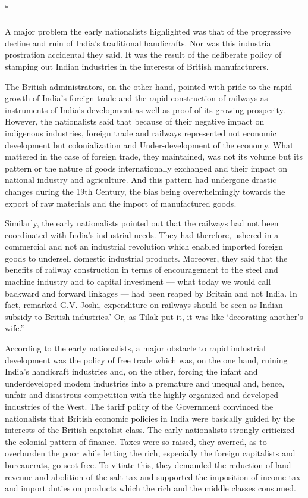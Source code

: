 \begin{center}*\end{center}

\paragraph*{}

A major problem the early nationalists highlighted was that of the progressive decline and ruin of India's traditional handicrafts. Nor was this industrial prostration accidental they said. It was the result of the deliberate policy of stamping out Indian industries in the interests of British manufacturers.

The British administrators, on the other hand, pointed with pride to the rapid growth of India's foreign trade and the rapid construction of railways as instruments of India's development as well as proof of its growing prosperity. However, the nationalists said that because of their negative impact on indigenous industries, foreign trade and railways represented not economic development but colonialization and Under-development of the economy. What mattered in the case of foreign trade, they maintained, was not its volume but its pattern or the nature of goods internationally exchanged and their impact on national industry and agriculture. And this pattern had undergone drastic changes during the 19th Century, the bias being overwhelmingly towards the export of raw materials and the import of manufactured goods.

Similarly, the early nationalists pointed out that the railways had not been coordinated with India's industrial needs. They had therefore, ushered in a commercial and not an industrial revolution which enabled imported foreign goods to undersell domestic industrial products. Moreover, they said that the benefits of railway construction in terms of encouragement to the steel and machine industry and to capital investment --- what today we would call backward and forward linkages --- had been reaped by Britain and not India. In fact, remarked G.V. Joshi, expenditure on railways should be seen as Indian subsidy to British industries.' Or, as Tilak put it, it was like `decorating another's wife.''

According to the early nationalists, a major obstacle to rapid industrial development was the policy of free trade which was, on the one hand, ruining India's handicraft industries and, on the other, forcing the infant and underdeveloped modem industries into a premature and unequal and, hence, unfair and disastrous competition with the highly organized and developed industries of the West. The tariff policy of the Government convinced the nationalists that British economic policies in India were basically guided by the interests of the British capitalist class. The early nationalists strongly criticized the colonial pattern of finance. Taxes were so raised, they averred, as to overburden the poor while letting the rich, especially the foreign capitalists and bureaucrats, go scot-free. To vitiate this, they demanded the reduction of land revenue and abolition of the salt tax and supported the imposition of income tax and import duties on products which the rich and the middle classes consumed.

